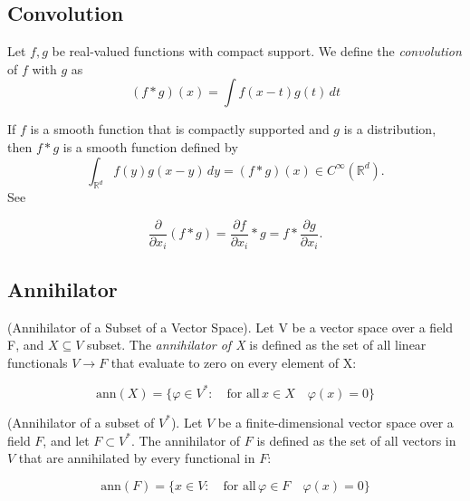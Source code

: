 \documentclass[../main.tex]{subfiles}
\begin{document}
\subsection{Convolution}
\begin{definition}
	Let $f,g$ be real-valued functions with compact support. We define the \emph{convolution} of $f$ with $g$ as $$(f\ast g)(x)=\int f(x-t)g(t) \, dt$$
\end{definition}


\begin{propo}
	If $f$ is a smooth function that is compactly supported and $g$ is a distribution, then $f\ast g$ is a smooth function defined by
	$${\displaystyle \int _{\mathbb {R} ^{d}}{f}(y)g(x-y)\,dy=(f*g)(x)\in C^{\infty }(\mathbb {R} ^{d}).} $$
	See \cite{adams2003sobolev}
	 \label{prop:29}
\end{propo}
\begin{propo} \label{prop:2}
	$${\frac {\partial }{\partial x_{i}}}(f*g)={\frac {\partial f}{\partial x_{i}}}*g=f*{\frac {\partial g}{\partial x_{i}}}.$$
\end{propo}

\subsection{Annihilator}

\begin{definition} (Annihilator of a Subset of a Vector Space). Let V be a vector space over a field F, and $X\subseteq V$ subset. The \textit{annihilator of X} is defined as the set of all linear functionals $V \rightarrow F$ that evaluate to zero on every element of X:
	
	$$ \text{ann}(X) = \{ \varphi \in V^* : \quad \text{for all} \,  x \in X \quad \varphi (x) = 0 \}$$
\end{definition}


\begin{definition} (Annihilator of a subset of $V^*$). Let $V$ be a finite-dimensional vector space over a field $F$, and let $F \subset V^*$. The annihilator of $F$ is defined as the set of all vectors in $V$ that are annihilated by every functional in $F$:
	
	\[
	\text{ann}(F) = \{x \in V :\quad \text{for all} \, \varphi \in F \quad\varphi(x) = 0\}
	\]
	
\end{definition}
\end{document}
